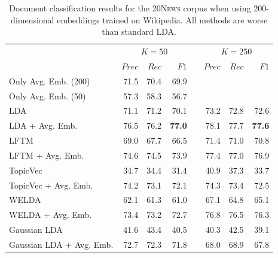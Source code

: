 \documentclass[
        a4paper,
        titlepage,
        twoside,
        parskip
        ]{scrbook}
\newcommand{\ra}[1]{\renewcommand{\arraystretch}{#1}}
\theoremstyle{break}
\begin{document}
\begin{table}[]
  \ra{1.3}
  \centering
  \caption{Document classification results for the \textsc{20News} corpus when using 200-dimensional embeddings trained on Wikipedia.
  All methods are worse than standard LDA.}
  \label{table:document_classification_dim-200}
  \begin{tabular}{lrrrcrrr}
    \toprule
    \multirow{2}{*}{} & \multicolumn{3}{c}{$K = 50$} & \phantom{a} & \multicolumn{3}{c}{$K = 250$} \\ \cmidrule{2-4} \cmidrule{6-8}
                      & $Prec$    & $Rec$     & $F1$     && $Prec$    & $Rec$   & $F1$     \\ \midrule
                      Only Avg. Emb. (200)     & 71.5    & 70.4    & 69.9   && \multicolumn{3}{l}{}        \\
                      Only Avg. Emb. (50)      & 57.3    & 58.3    & 56.7   && \multicolumn{3}{l}{}        \\
                      LDA                      & 71.1    & 71.2    & 70.1   && 73.2    & 72.8     & 72.6   \\
                      LDA + Avg. Emb.          & 76.5    & 76.2    & \textbf{77.0}   && 78.1    & 77.7     & \textbf{77.6}   \\
                      LFTM                     & 69.0    & 67.7    & 66.5   && 71.4    & 71.0     & 70.8   \\
                      LFTM + Avg. Emb.         & 74.6    & 74.5    & 73.9   && 77.4    & 77.0     & 76.9   \\
                      TopicVec                 & 34.7    & 34.4    & 31.4   && 40.9    & 37.3     & 33.7   \\
                      TopicVec + Avg. Emb.     & 74.2    & 73.1    & 72.1   && 74.3    & 73.4     & 72.5   \\
                      WELDA                    & 62.1    & 61.3    & 61.0   && 67.1    & 64.8     & 65.1   \\
                      WELDA + Avg. Emb.        & 73.4    & 73.2    & 72.7   && 76.8    & 76.5     & 76.3   \\
                      Gaussian LDA             & 41.6    & 43.4    & 40.5   && 40.3    & 42.5     & 39.1   \\
                      Gaussian LDA + Avg. Emb. & 72.7    & 72.3    & 71.8   && 68.0    & 68.9     & 67.8   \\
  \bottomrule
  \end{tabular}
\end{table}
\end{document}
